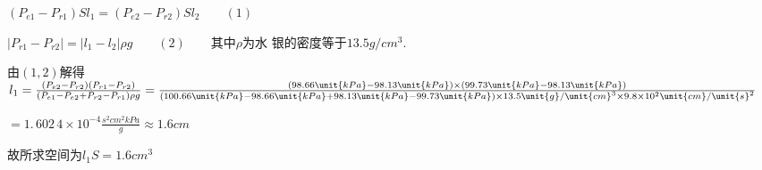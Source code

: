 \documentclass{article}
\begin{document}
$\left( P_{e1}-P_{r1}\right) Sl_{1}=\left( P_{e2}-P_{r2}\right) Sl_{2}\qquad
\left( 1\right) $

$\left\vert P_{r1}-P_{r2}\right\vert =\left\vert l_{1}-l_{2}\right\vert \rho
g\qquad \left( 2\right) \qquad $其中$\rho $为水%
银的密度等于$13.5\unit{g}/\unit{cm}^{3}.$

由$\left( 1,2\right) $解得\qquad $l_{1}=\frac{\left(
P_{e2}-P_{r2}\right) \left( P_{r1}-P_{r2}\right) }{\left(
P_{e1}-P_{e2}+P_{r2}-P_{r1}\right) \rho g}=\frac{\left( 98.66\unit{kPa}-98.13%
\unit{kPa}\right) \times \left( 99.73\unit{kPa}-98.13\unit{kPa}\right) }{%
\left( 100.66\unit{kPa}-98.66\unit{kPa}+98.13\unit{kPa}-99.73\unit{kPa}%
\right) \times 13.5\unit{g}/\unit{cm}^{3}\times 9.8\times 10^{2}\unit{cm}/%
\unit{s}^{2}}$

$=\allowbreak 1.\,\allowbreak 602\,4\times 10^{-4}\frac{\unit{s}^{2}\unit{cm}%
^{2}\unit{kPa}\allowbreak }{\unit{g}}\approx 1.6\unit{cm}$

故所求空间为\qquad $l_{1}S=1.6\unit{cm}%
^{3}$
\end{document}
